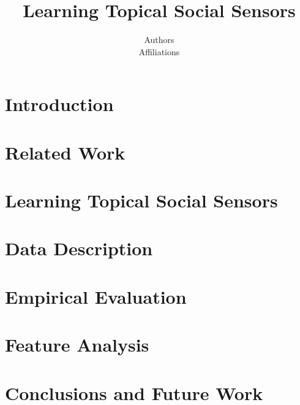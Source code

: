 \documentclass[letterpaper]{article}
\begin{document}
%
\title{Learning Topical Social Sensors}
\author{Authors\\
Affiliations
}
\maketitle
\begin{abstract}

\end{abstract}

\section{Introduction}


\section{Related Work}


\section{Learning Topical Social Sensors}
\label{sec:lss}


\section{Data Description}
\label{sec:datasetStatistics}


\section{Empirical Evaluation}
\label{sec:methodology}


\section{Feature Analysis}
\label{label:featureanalysis}


\section{Conclusions and Future Work}


%
%



\end{document}
